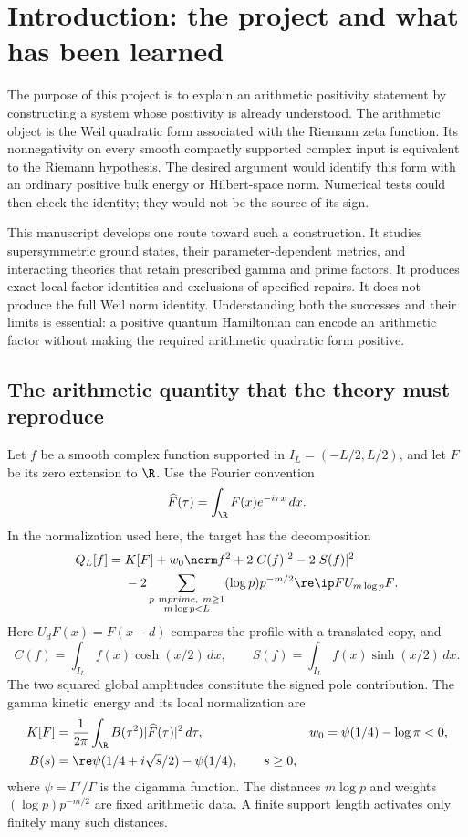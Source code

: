 \section{Introduction: the project and what has been learned}
\label{sec:introduction}
The purpose of this project is to explain an arithmetic positivity statement by constructing a system whose positivity is already understood. The arithmetic object is the Weil quadratic form associated with the Riemann zeta function. Its nonnegativity on every smooth compactly supported complex input is equivalent to the Riemann hypothesis. The desired argument would identify this form with an ordinary positive bulk energy or Hilbert-space norm. Numerical tests could then check the identity; they would not be the source of its sign.

This manuscript develops one route toward such a construction. It studies supersymmetric ground states, their parameter-dependent metrics, and interacting theories that retain prescribed gamma and prime factors. It produces exact local-factor identities and exclusions of specified repairs. It does not produce the full Weil norm identity. Understanding both the successes and their limits is essential: a positive quantum Hamiltonian can encode an arithmetic factor without making the required arithmetic quadratic form positive.

\subsection{The arithmetic quantity that the theory must reproduce}
Let $f$ be a smooth complex function supported in $I_L=(-L/2,L/2)$, and let $F$ be its zero extension to $\R$. Use the Fourier convention
\[
\widehat F(\tau)=\int_{\R}F(x)e^{-i\tau x}\,dx.
\]
In the normalization used here, the target has the decomposition
\begin{equation}\label{intro:target}
\begin{split}
Q_L[f]={}&K[F]+w_0\norm f^2+2|C(f)|^2-2|S(f)|^2\\
&-2\sum_{\substack{p\ {
m prime},\ m\ge1\\m\log p<L}}
(\log p)p^{-m/2}\re\ip F{U_{m\log p}F}.
\end{split}
\end{equation}
Here $U_dF(x)=F(x-d)$ compares the profile with a translated copy, and
\[
C(f)=\int_{I_L}f(x)\cosh(x/2)\,dx,\qquad
S(f)=\int_{I_L}f(x)\sinh(x/2)\,dx.
\]
The two squared global amplitudes constitute the signed pole contribution. The gamma kinetic energy and its local normalization are
\begin{align}
K[F]&=\frac1{2\pi}\int_{\R}B(\tau^2)|\widehat F(\tau)|^2\,d\tau,
& w_0&=\psi(1/4)-\log\pi<0,\label{intro:kinetic}\\
B(s)&=\re\psi(1/4+i\sqrt{s}/2)-\psi(1/4),\qquad s\ge0,\nonumber
\end{align}
where $\psi=\Gamma'/\Gamma$ is the digamma function. The distances $m\log p$ and weights $(\log p)p^{-m/2}$ are fixed arithmetic data. A finite support length activates only finitely many such distances.

